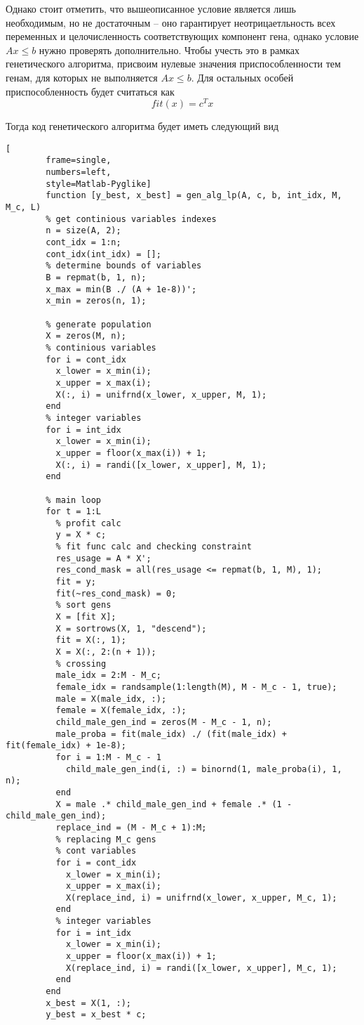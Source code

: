 \documentclass[../main.tex]{subfiles}
\begin{document}
 	 Однако стоит отметить, что вышеописанное условие является лишь необходимым, но не достаточным -- оно гарантирует неотрицаетльность всех переменных и целочисленность соответствующих компонент гена, однако условие $Ax\leqslant b$ нужно проверять дополнительно. Чтобы учесть это в рамках генетического алгоритма, присвоим нулевые значения приспособленности тем генам, для которых не выполняется $Ax \leqslant b$. Для остальных особей приспособленность будет считаться как
 	 \[fit(x) = c^T x\] 
 	 
 	 Тогда код генетического алгоритма будет иметь следующий вид
 	 
 	 
 	 \begin{lstlisting}[
 	 	frame=single,
 	 	numbers=left,
 	 	style=Matlab-Pyglike]
 	 	function [y_best, x_best] = gen_alg_lp(A, c, b, int_idx, M, M_c, L) 
 	 	% get continious variables indexes
 	 	n = size(A, 2);
 	 	cont_idx = 1:n;
 	 	cont_idx(int_idx) = [];
 	 	% determine bounds of variables
 	 	B = repmat(b, 1, n);
 	 	x_max = min(B ./ (A + 1e-8))';
 	 	x_min = zeros(n, 1);
 	 	
 	 	% generate population
 	 	X = zeros(M, n);
 	 	% continious variables
 	 	for i = cont_idx
 	 	  x_lower = x_min(i);
 	 	  x_upper = x_max(i);
 	 	  X(:, i) = unifrnd(x_lower, x_upper, M, 1);
 	 	end
 	 	% integer variables
 	 	for i = int_idx
 	 	  x_lower = x_min(i);
 	 	  x_upper = floor(x_max(i)) + 1;
 	   	  X(:, i) = randi([x_lower, x_upper], M, 1);
 	 	end
 	 	
 	 	% main loop
 	 	for t = 1:L
 	 	  % profit calc
 	 	  y = X * c;
 	 	  % fit func calc and checking constraint
 	 	  res_usage = A * X';
 	 	  res_cond_mask = all(res_usage <= repmat(b, 1, M), 1);
 	 	  fit = y;
 	 	  fit(~res_cond_mask) = 0;
 	 	  % sort gens
 	 	  X = [fit X];
 	 	  X = sortrows(X, 1, "descend");
 	 	  fit = X(:, 1);
 	 	  X = X(:, 2:(n + 1));
 	 	  % crossing
 	 	  male_idx = 2:M - M_c;
 	 	  female_idx = randsample(1:length(M), M - M_c - 1, true);
 	 	  male = X(male_idx, :);
 	 	  female = X(female_idx, :);
 	 	  child_male_gen_ind = zeros(M - M_c - 1, n);
 	 	  male_proba = fit(male_idx) ./ (fit(male_idx) + fit(female_idx) + 1e-8);
 	 	  for i = 1:M - M_c - 1
 	 	    child_male_gen_ind(i, :) = binornd(1, male_proba(i), 1, n);
 	 	  end
 	 	  X = male .* child_male_gen_ind + female .* (1 - child_male_gen_ind);
 	 	  replace_ind = (M - M_c + 1):M;
 	 	  % replacing M_c gens
 	 	  % cont variables
 	 	  for i = cont_idx
 	 	    x_lower = x_min(i);
 	 	    x_upper = x_max(i);
 	 	    X(replace_ind, i) = unifrnd(x_lower, x_upper, M_c, 1);
 	 	  end
 	 	  % integer variables
 	 	  for i = int_idx
 	 	    x_lower = x_min(i);
 	 	    x_upper = floor(x_max(i)) + 1;
 	 	    X(replace_ind, i) = randi([x_lower, x_upper], M_c, 1);
 	 	  end
 	 	end
 	 	x_best = X(1, :);
 	 	y_best = x_best * c;
 	 	
 	 \end{lstlisting}
 	
\end{document}
